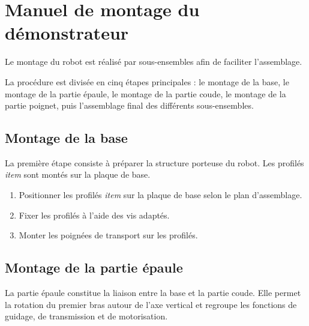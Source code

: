 \section{Manuel de montage du démonstrateur}
\label{chap:manuel_de_montage}
Le montage du robot est réalisé par sous-ensembles afin de faciliter
l'assemblage. 

La procédure est divisée en cinq étapes
principales : le montage de la base, le montage de la partie épaule, le montage de la partie coude, le montage
de la partie poignet, puis l'assemblage final des différents sous-ensembles.
\subsection{Montage de la base}
La première étape consiste à préparer la structure porteuse du robot. Les profilés \textit{item} sont montés sur la plaque de base.

\begin{enumerate}
    \item Positionner les profilés \textit{item} sur la plaque de base selon le plan d'assemblage.
    
    \item Fixer les profilés à l'aide des vis adaptés.
    \item Monter les poignées de transport sur les profilés.
\end{enumerate} 
\subsection{Montage de la partie épaule}

La partie épaule constitue la liaison entre la base et la partie coude. Elle permet la rotation du premier bras autour de l'axe vertical et regroupe les fonctions de guidage, de transmission et de motorisation.

